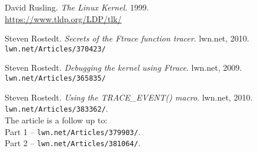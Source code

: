 \documentclass[10pt, oneside]{book}
\begin{document}
\begin{thebibliography}{}
David Rusling.
\textit{The Linux Kernel.}
1999.\\
\url{https://www.tldp.org/LDP/tlk/}

Steven Rostedt.
\textit{Secrets of the Ftrace function tracer}.
lwn.net, 2010.
\texttt{lwn.net/Articles/370423/}

Steven Rostedt.
\textit{Debugging the kernel using Ftrace}.
lwn.net, 2009.
\texttt{lwn.net/Articles/365835/}

Steven Rostedt.
\textit{Using the TRACE\_EVENT() macro}.
lwn.net, 2010.
\texttt{lwn.net/Articles/383362/}.\\
The article is a follow up to:\\
Part 1 -- \texttt{lwn.net/Articles/379903/}.\\
Part 2 -- \texttt{lwn.net/Articles/381064/}.
\end{thebibliography}
\end{document}
